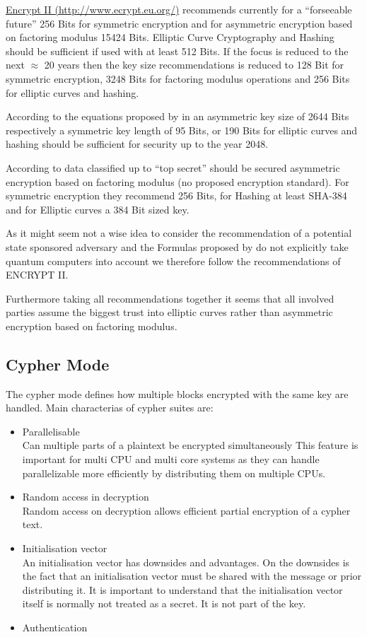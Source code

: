 \href{http://www.ecrypt.eu.org/}{Encrypt II (http://www.ecrypt.eu.org/)} recommends currently for a ``forseeable future'' 256 Bits for symmetric encryption and for asymmetric encryption based on factoring modulus 15424 Bits. Elliptic Curve Cryptography and Hashing should be sufficient if used with at least 512 Bits. If the focus is reduced to the next $\approx$ 20 years then the key size recommendations is reduced to 128 Bit for symmetric encryption, 3248 Bits for factoring modulus operations and 256 Bits for elliptic curves and hashing.

According to the equations proposed by \citeauthor{Lenstra04keylength.} in \cite{Lenstra04keylength.} an asymmetric key size of 2644 Bits respectively a symmetric key length of 95 Bits, or 190 Bits for elliptic curves and hashing should be sufficient for security up to the year 2048. 

According to \cite{nsa-fact-sheet-B} data classified up to ``top secret'' should be secured asymmetric encryption based on factoring modulus (no proposed encryption standard).  For symmetric encryption they recommend 256 Bits, for Hashing at least SHA-384 and for Elliptic curves a 384 Bit sized key.

As it might seem not a wise idea to consider the recommendation of a potential state sponsored adversary and the Formulas proposed by \citeauthor{Lenstra04keylength.} do not explicitly take quantum computers into account we therefore follow the recommendations of ENCRYPT II.

Furthermore taking all recommendations together it seems that all involved parties assume the biggest trust into elliptic curves rather than asymmetric encryption based on factoring modulus.

\subsection{Cypher Mode}
The cypher mode defines how multiple blocks encrypted with the same key are handled. Main characterias of cypher suites are:
\begin{itemize}
	\item Parallelisable\\ 
	Can multiple parts of a plaintext be encrypted simultaneously This feature is important for multi CPU and multi core systems as they can handle parallelizable more efficiently by distributing them on multiple CPUs.
	\item Random access in decryption\\
	Random access on decryption allows efficient partial encryption of a cypher text.
	\item Initialisation vector\\
	An initialisation vector has downsides and advantages. On the downsides is the fact that an initialisation vector must be shared with the message or prior distributing it. It is important to understand that the initialisation vector itself is normally not treated as a secret. It is not part of the key.
	\item Authentication
\end{itemize}

